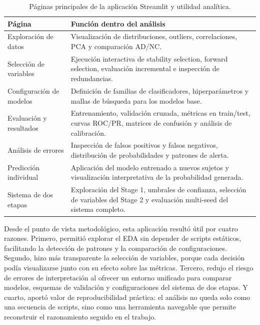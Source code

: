 \begin{table}[ht]
\centering
\caption{Páginas principales de la aplicación Streamlit y utilidad analítica.}
\label{tab:streamlit_pages}
\begin{tabular}{>{\raggedright\arraybackslash}p{4cm}>{\raggedright\arraybackslash}p{8.5cm}}
\hline
\textbf{Página} & \textbf{Función dentro del análisis} \\
\hline
Exploración de datos & Visualización de distribuciones, outliers, correlaciones, PCA y comparación AD/NC. \\
Selección de variables & Ejecución interactiva de stability selection, forward selection, evaluación incremental e inspección de redundancias. \\
Configuración de modelos & Definición de familias de clasificadores, hiperparámetros y mallas de búsqueda para los modelos base. \\
Evaluación y resultados & Entrenamiento, validación cruzada, métricas en train/test, curvas ROC/PR, matrices de confusión y análisis de calibración. \\
Análisis de errores & Inspección de falsos positivos y falsos negativos, distribución de probabilidades y patrones de alerta. \\
Predicción individual & Aplicación del modelo entrenado a nuevos sujetos y visualización interpretativa de la probabilidad generada. \\
Sistema de dos etapas & Exploración del Stage 1, umbrales de confianza, selección de variables del Stage 2 y evaluación multi-seed del sistema completo. \\
\hline
\end{tabular}
\end{table}

Desde el punto de vista metodológico, esta aplicación resultó útil por cuatro razones. Primero, permitió explorar el EDA
sin depender de scripts estáticos, facilitando la detección de patrones y la comparación de configuraciones.
Segundo, hizo más transparente la selección de variables, porque cada decisión podía visualizarse junto con su efecto
sobre las métricas. Tercero, redujo el riesgo de errores de interpretación al ofrecer un entorno unificado para comparar modelos, esquemas de validación y configuraciones del sistema de dos etapas. Y cuarto, aportó valor de reproducibilidad práctica: el análisis no queda solo como una secuencia de scripts, sino como una herramienta navegable que permite reconstruir el razonamiento seguido en el trabajo.

